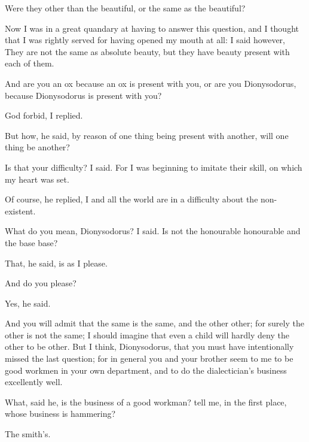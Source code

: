 \documentclass[11pt,letter]{article}
\begin{document}
\par  Were they other than the beautiful, or the same as the beautiful?

\par  Now I was in a great quandary at having to answer this question, and I thought that I was rightly served for having opened my mouth at all: I said however, They are not the same as absolute beauty, but they have beauty present with each of them.

\par  And are you an ox because an ox is present with you, or are you Dionysodorus, because Dionysodorus is present with you?

\par  God forbid, I replied.

\par  But how, he said, by reason of one thing being present with another, will one thing be another?

\par  Is that your difficulty? I said. For I was beginning to imitate their skill, on which my heart was set.

\par  Of course, he replied, I and all the world are in a difficulty about the non-existent.

\par  What do you mean, Dionysodorus? I said. Is not the honourable honourable and the base base?

\par  That, he said, is as I please.

\par  And do you please?

\par  Yes, he said.

\par  And you will admit that the same is the same, and the other other; for surely the other is not the same; I should imagine that even a child will hardly deny the other to be other. But I think, Dionysodorus, that you must have intentionally missed the last question; for in general you and your brother seem to me to be good workmen in your own department, and to do the dialectician's business excellently well.

\par  What, said he, is the business of a good workman? tell me, in the first place, whose business is hammering?

\par  The smith's.
\end{document}
